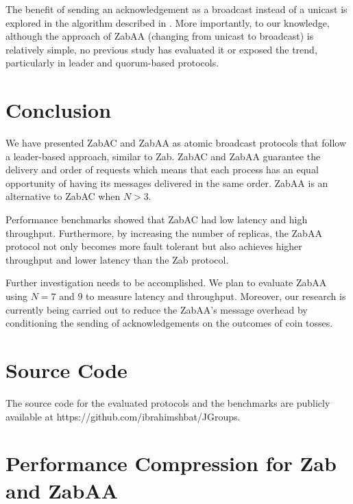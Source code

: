 \documentclass[a4paper,UKenglish]{oasics-v2016}
\begin{document}
The benefit of sending an acknowledgement as a broadcast instead of a unicast is explored in the algorithm described in \cite{r41}. More importantly, to our knowledge, although the approach of ZabAA (changing from unicast to broadcast) is relatively simple, no previous study has evaluated it or exposed the trend, particularly in leader and quorum-based protocols. 



\section{Conclusion} \label{Conclusion}

We have presented ZabAC and ZabAA as atomic broadcast protocols
that follow a leader-based approach, similar to Zab. ZabAC and ZabAA guarantee the delivery and order of requests which means that each process has an equal opportunity of having its messages delivered in the same order. ZabAA is an alternative to ZabAC when $N > 3$.

Performance benchmarks showed that ZabAC had low latency and high throughput. Furthermore, by increasing the number of replicas, the ZabAA protocol not only becomes more fault tolerant but also achieves higher throughput and lower latency than the Zab protocol.


Further investigation needs to be accomplished. We plan to evaluate ZabAA using $N=7$ and $9$ to measure latency and throughput. Moreover, our research is currently being carried out to reduce the ZabAA's message overhead by conditioning the sending of acknowledgements on the outcomes of coin tosses.



\appendix

\section{Source Code}
The source code for the evaluated protocols and the benchmarks are publicly available at https://github.com/ibrahimshbat/JGroups.

\section{Performance Compression for Zab and ZabAA}
\end{document}
